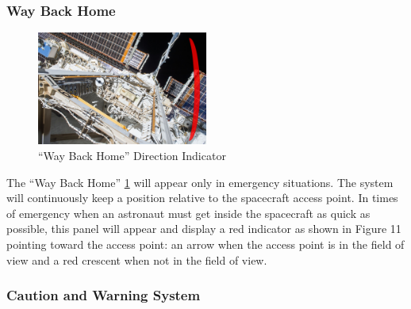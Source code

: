 \documentclass{article}
\let\Oldsubsubsection\subsubsection
\renewcommand{\subsubsection}{\FloatBarrier\Oldsubsubsection}
\begin{document}
\subsubsection{Way Back Home}

\begin{figure}[!htb]
  \centering
  \includegraphics[width=0.5\textwidth]{assets/wayhome.png}
  \caption{“Way Back Home” Direction Indicator}
  \label{fig:wayhome}
\end{figure}

The “Way Back Home” \ref{fig:wayhome} will appear only in emergency situations. The system will continuously keep a position relative to the spacecraft access point. In times of emergency when an astronaut must get inside the spacecraft as quick as possible, this panel will appear and display a red indicator as shown in Figure 11 pointing toward the access point: an arrow when the access point is in the field of view and a red crescent when not in the field of view. 

\subsubsection{Caution and Warning System}
\end{document}
